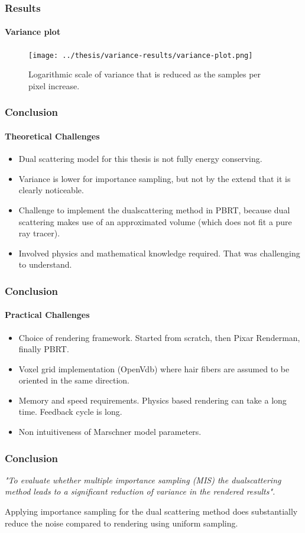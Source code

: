 \documentclass{beamer}
\begin{document}
\begin{frame}
    \frametitle{Results}
    \framesubtitle{Variance plot}
    
    \begin{figure}
    \centering
    \texttt{[image: ../thesis/variance-results/variance-plot.png]} 
    \caption{Logarithmic scale of variance that is reduced as the samples per pixel increase.}
    \end{figure}
  \end{frame}
  
  
  \begin{frame}
    \frametitle{Conclusion}
    \framesubtitle{Theoretical Challenges}
	
	\begin{itemize}
	\item Dual scattering model for this thesis is not fully energy conserving.
	\item Variance is lower for importance sampling, but not by the extend that it is clearly noticeable.
	\item Challenge to implement the dualscattering method in PBRT, because dual scattering makes use of an approximated volume (which does not fit a pure ray tracer).
	\item Involved physics and mathematical knowledge required. That was challenging to understand.
	\end{itemize}
  \end{frame}
  
  \begin{frame}
    \frametitle{Conclusion}
    \framesubtitle{Practical Challenges}
	
	\begin{itemize}
	\item Choice of rendering framework. Started from scratch, then Pixar Renderman, finally PBRT.
	\item Voxel grid implementation (OpenVdb) where hair fibers are assumed to be oriented in the same direction.
	\item Memory and speed requirements. Physics based rendering can take a long time. Feedback cycle is long.
	\item Non intuitiveness of Marschner model parameters.
	\end{itemize}
  \end{frame}
  
  \begin{frame}
  \frametitle{Conclusion}
  
  \begin{center}
	\textit{"To evaluate whether multiple importance sampling (MIS) the dualscattering method leads to a significant reduction of variance in the rendered results".}
	\end{center}
	
  
  Applying importance sampling for the dual scattering method does substantially reduce the noise compared to rendering using uniform sampling.
  \end{frame}
  
\end{document}
